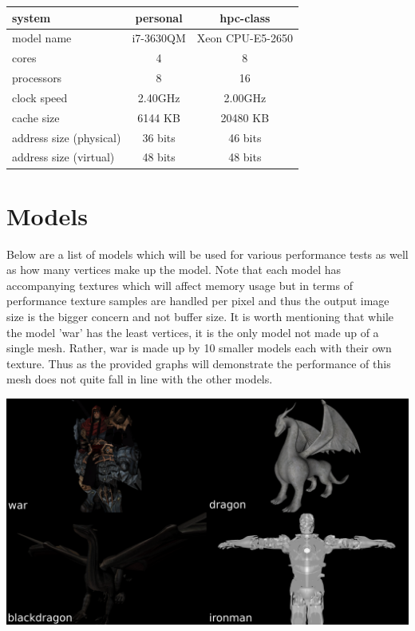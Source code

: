 \documentclass[12pt]{article}
\begin{document}
\bigbreak
\begin{center}
	\begin{tabular}{|l|c|c|}
		\hline
		system & personal & hpc-class \\ \hline \hline
		model name & i7-3630QM & Xeon CPU-E5-2650 \\ \hline
		cores & 4 & 8 \\ \hline
		processors & 8 & 16 \\ \hline
		clock speed & 2.40GHz & 2.00GHz \\ \hline
		cache size & 6144 KB & 20480 KB \\ \hline
		address size (physical) & 36 bits & 46 bits \\ \hline
		address size (virtual) & 48 bits & 48 bits \\ \hline
	\end{tabular}
\end{center}

\section*{Models}

Below are a list of models which will be used for various performance tests as well as how many
vertices make up the model. Note that each model has accompanying textures which will affect memory
usage but in terms of performance texture samples are handled per pixel and thus the output image
size is the bigger concern and not buffer size.
It is worth mentioning that while the model 'war' has the least vertices, it is the only model
not made up of a single mesh. Rather, war is made up by 10 smaller models each with their own texture.
Thus as the provided graphs will demonstrate the performance of this mesh does not quite fall in line
with the other models.

\begin{center}
	\includegraphics[scale=0.225]{models.png}
\end{center}
\end{document}
